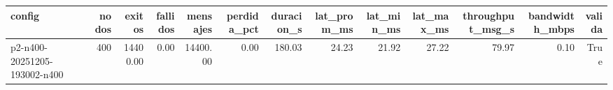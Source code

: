 \begin{tabular}{lrrrrrrrrrrrr}
\toprule
config & nodos & exitos & fallidos & mensajes & perdida_pct & duracion_s & lat_prom_ms & lat_min_ms & lat_max_ms & throughput_msg_s & bandwidth_mbps & valida \\
\midrule
p2-n400-20251205-193002-n400 & 400 & 14400.00 & 0.00 & 14400.00 & 0.00 & 180.03 & 24.23 & 21.92 & 27.22 & 79.97 & 0.10 & True \\
\bottomrule
\end{tabular}
